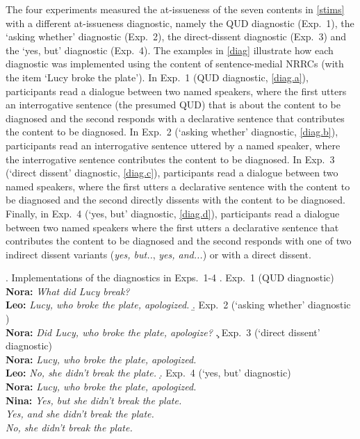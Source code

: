 \documentclass[times,linguex,xcolor]{glossa}
\begin{document}
      The four experiments measured the at-issueness of the seven contents in \ref{stims} with a different at-issueness diagnostic, namely the QUD diagnostic (Exp.~1), the `asking whether' diagnostic (Exp.~2), the direct-dissent diagnostic (Exp.~3) and the `yes, but' diagnostic (Exp.~4). The examples in \ref{diag} illustrate how each diagnostic was implemented using the content of sentence-medial NRRCs (with the item `Lucy broke the plate'). In Exp.~1 (QUD diagnostic, \ref{diag.a}), participants read a dialogue between two named speakers, where the first utters an interrogative sentence (the presumed QUD) that is about the content to be diagnosed and the second responds with a declarative sentence that contributes the content to be diagnosed. In Exp.~2 (`asking whether' diagnostic, \ref{diag.b}), participants read an interrogative sentence uttered by a named speaker, where the interrogative sentence contributes the content to be diagnosed. In Exp.~3 (`direct dissent' diagnostic, \ref{diag.c}), participants read a dialogue between two named speakers, where the first utters a declarative sentence with the content to be diagnosed and the second directly dissents with the content to be diagnosed. Finally, in Exp.~4 (`yes, but' diagnostic, \ref{diag.d}), participants read a dialogue between two named speakers where the first utters a declarative sentence that contributes the content to be diagnosed and the second responds with one of two indirect dissent variants (\emph{yes, but..}, \emph{yes, and...}) or with a direct dissent.

      \ex.\label{diag} Implementations of the diagnostics in Exps.~1-4
      \a.\label{diag.a} Exp.~1 (QUD diagnostic)
      \\ {\bf Nora:} \emph{What did Lucy break?}
      \\ {\bf Leo:} \emph{Lucy, who broke the plate, apologized.}
      \b.\label{diag.b} Exp.~2 (`asking whether' diagnostic )
      \\ {\bf Nora:} \emph{Did Lucy, who broke the plate, apologize?}
      \c.\label{diag.c} Exp.~3 (`direct dissent' diagnostic)
      \\ {\bf Nora:} \emph{Lucy, who broke the plate, apologized.}
      \\ {\bf Leo:} \emph{No, she didn't break the plate.}
      \d.\label{diag.d} Exp.~4 (`yes, but' diagnostic)
      \\ {\bf Nora:} \emph{Lucy, who broke the plate, apologized.}
      \\ {\bf Nina:} \emph{Yes, but she didn't break the plate.}
      \\ \hspace*{1cm} \emph{Yes, and she didn't break the plate.}
      \\ \hspace*{1cm} \emph{No, she didn't break the plate.}
\end{document}
